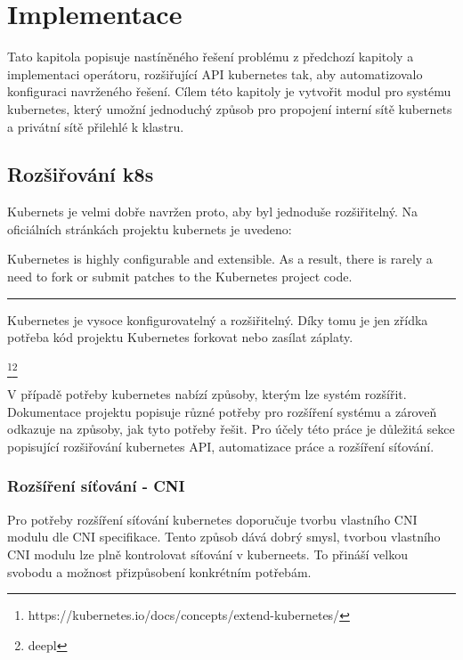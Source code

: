 \chapter{Implementace}
\noindent\makebox[\linewidth]{\rule{\paperwidth}{0.4pt}}
\begin{chapterabstract}
Tato kapitola popisuje nastíněného řešení problému z předchozí kapitoly a implementaci operátoru, rozšiřující API kubernetes tak, aby automatizovalo konfiguraci navrženého řešení. Cílem této kapitoly je vytvořit modul pro systému kubernetes, který umožní jednoduchý způsob pro propojení interní sítě kubernets a privátní sítě přilehlé k klastru.
\end{chapterabstract}

\section{Rozšiřování k8s}
Kubernets je velmi dobře navržen proto, aby byl jednoduše rozšiřitelný. Na oficiálních stránkách projektu kubernets je uvedeno: 
\begin{displayquote}

Kubernetes is highly configurable and extensible. As a result, there is rarely a need to fork or submit patches to the Kubernetes project code.
\end{displayquote}
\noindent\rule{2cm}{0.4pt}
\begin{displayquote}
Kubernetes je vysoce konfigurovatelný a rozšiřitelný. Díky tomu je jen zřídka potřeba kód projektu Kubernetes forkovat nebo zasílat záplaty.
\end{displayquote}
\footnote{https://kubernetes.io/docs/concepts/extend-kubernetes/}\footnote{deepl}

V případě potřeby kubernetes nabízí způsoby, kterým lze systém rozšířit. Dokumentace projektu popisuje různé potřeby pro rozšíření systému a zároveň odkazuje na způsoby, jak tyto potřeby řešit. Pro účely této práce je důležitá sekce popisující rozšiřování kubernetes API, automatizace práce a rozšíření síťování.

\subsection{Rozšíření síťování - CNI}
Pro potřeby rozšíření síťování kubernetes doporučuje tvorbu vlastního CNI modulu dle CNI specifikace. Tento způsob dává dobrý smysl, tvorbou vlastního CNI modulu lze plně kontrolovat síťování v kuberneets. To přináší velkou svobodu a možnost přizpůsobení konkrétním potřebám.

